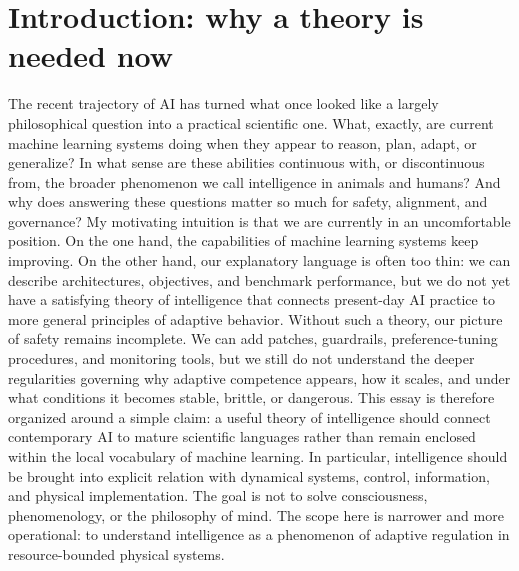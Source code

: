 \documentclass[11pt]{article}
\begin{document}
\section{Introduction: why a theory is needed now}
The recent trajectory of AI has turned what once looked like a largely philosophical question into a practical scientific one. What, exactly, are current machine learning systems doing when they appear to reason, plan, adapt, or generalize? In what sense are these abilities continuous with, or discontinuous from, the broader phenomenon we call intelligence in animals and humans? And why does answering these questions matter so much for safety, alignment, and governance? My motivating intuition is that we are currently in an uncomfortable position. On the one hand, the capabilities of machine learning systems keep improving. On the other hand, our explanatory language is often too thin: we can describe architectures, objectives, and benchmark performance, but we do not yet have a satisfying theory of intelligence that connects present-day AI practice to more general principles of adaptive behavior. Without such a theory, our picture of safety remains incomplete. We can add patches, guardrails, preference-tuning procedures, and monitoring tools, but we still do not understand the deeper regularities governing why adaptive competence appears, how it scales, and under what conditions it becomes stable, brittle, or dangerous. This essay is therefore organized around a simple claim: a useful theory of intelligence should connect contemporary AI to mature scientific languages rather than remain enclosed within the local
vocabulary of machine learning. In particular, intelligence should be brought into explicit relation with dynamical systems, control, information, and physical implementation. The goal is not to solve consciousness, phenomenology, or the philosophy of mind. The scope here is narrower and more operational: to understand intelligence as a phenomenon of adaptive regulation in resource-bounded physical systems.
\end{document}
